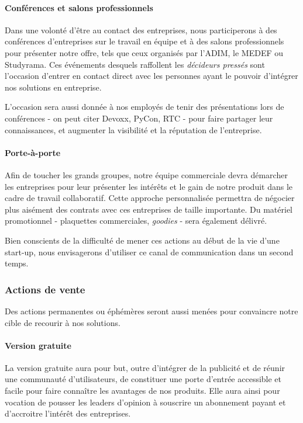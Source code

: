 \documentclass[10pt,twocolumn,a4paper,utf8x]{article}
\begin{document}
\paragraph{Conférences et salons professionnels}

Dans une volonté d'être au contact des entreprises, nous participerons à
des conférences d'entreprises sur le travail en équipe et à des salons
professionnels pour présenter notre offre, tels que ceux organisés par
l'ADIM, le MEDEF ou Studyrama. Ces événements desquels raffollent les
\emph{décideurs pressés} sont l'occasion d'entrer en contact direct avec
les personnes ayant le pouvoir d'intégrer nos solutions en entreprise.

L'occasion sera aussi donnée à nos employés de tenir des présentations
lors de conférences - on peut citer Devoxx, PyCon, RTC - pour faire
partager leur connaissances, et augmenter la visibilité et la réputation
de l'entreprise.

\paragraph{Porte-à-porte}

Afin de toucher les grands groupes, notre équipe commerciale devra
démarcher les entreprises pour leur présenter les intérêts et le gain de
notre produit dans le cadre de travail collaboratif. Cette approche
personnalisée permettra de négocier plus aisément des contrats avec ces
entreprises de taille importante. Du matériel promotionnel - plaquettes
commerciales, \emph{goodies} - sera également délivré.

Bien conscients de la difficulté de mener ces actions au début de la vie
d'une start-up, nous envisagerons d'utiliser ce canal de communication
dans un second temps.

\subsubsection{Actions de vente}

Des actions permanentes ou éphémères seront aussi menées pour convaincre
notre cible de recourir à nos solutions.

\paragraph{Version gratuite}

La version gratuite aura pour but, outre d'intégrer de la publicité et
de réunir une communauté d'utilisateurs, de constituer une porte
d'entrée accessible et facile pour faire connaître les avantages de nos
produits. Elle aura ainsi pour vocation de pousser les leaders d'opinion
à souscrire un abonnement payant et d'accroitre l'intérêt des
entreprises.
\end{document}
